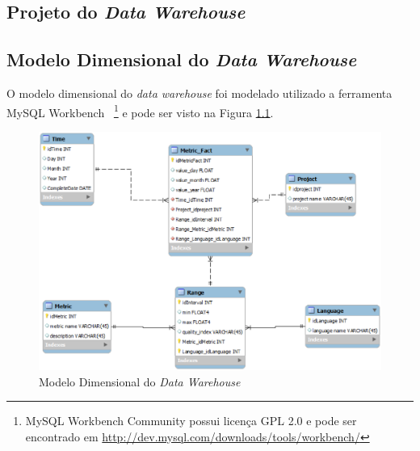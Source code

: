 \begin{apendicesenv}

\chapter{Projeto do \textit{Data Warehouse}}

\section{Modelo Dimensional do \textit{Data Warehouse}}

O modelo dimensional do \textit{data warehouse} foi modelado utilizado a ferramenta MySQL Workbench ~\footnote{MySQL Workbench Community possui licença GPL 2.0 e pode ser encontrado em \url{http://dev.mysql.com/downloads/tools/workbench/}} e pode ser visto na Figura \ref{esquema}.

\begin{figure}[ht!]
\centering
\includegraphics[keepaspectratio=false,scale=0.60]{apendices/esquema.eps}
\caption{Modelo Dimensional do \textit{Data Warehouse}}
\label{esquema}
\end{figure}
\FloatBarrier

\clearpage

\end{apendicesenv}
